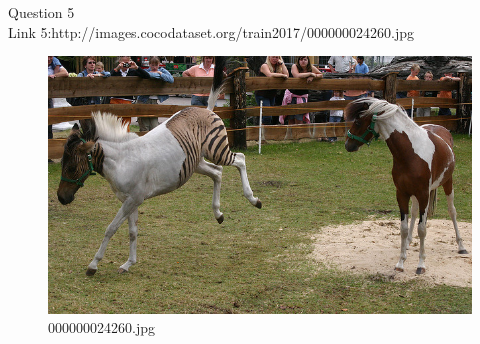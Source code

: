 Question 5\\
Link 5:http://images.cocodataset.org/train2017/000000024260.jpg
    \begin{figure}[h]
        \centering
        \includegraphics[width=0.8\linewidth]{../image set/easy/000000024260.jpg}
        \caption{000000024260.jpg}
    \end{figure}
